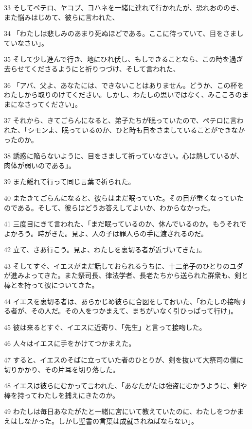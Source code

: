 \par 33 そしてペテロ、ヤコブ、ヨハネを一緒に連れて行かれたが、恐れおののき、また悩みはじめて、彼らに言われた、
\par 34 「わたしは悲しみのあまり死ぬほどである。ここに待っていて、目をさましていなさい」。
\par 35 そして少し進んで行き、地にひれ伏し、もしできることなら、この時を過ぎ去らせてくださるようにと祈りつづけ、そして言われた、
\par 36 「アバ、父よ、あなたには、できないことはありません。どうか、この杯をわたしから取りのけてください。しかし、わたしの思いではなく、みこころのままになさってください」。
\par 37 それから、きてごらんになると、弟子たちが眠っていたので、ペテロに言われた、「シモンよ、眠っているのか、ひと時も目をさましていることができなかったのか。
\par 38 誘惑に陥らないように、目をさまして祈っていなさい。心は熱しているが、肉体が弱いのである」。
\par 39 また離れて行って同じ言葉で祈られた。
\par 40 またきてごらんになると、彼らはまだ眠っていた。その目が重くなっていたのである。そして、彼らはどうお答えしてよいか、わからなかった。
\par 41 三度目にきて言われた、「まだ眠っているのか、休んでいるのか。もうそれでよかろう。時がきた。見よ、人の子は罪人らの手に渡されるのだ。
\par 42 立て、さあ行こう。見よ、わたしを裏切る者が近づいてきた」。
\par 43 そしてすぐ、イエスがまだ話しておられるうちに、十二弟子のひとりのユダが進みよってきた。また祭司長、律法学者、長老たちから送られた群衆も、剣と棒とを持って彼についてきた。
\par 44 イエスを裏切る者は、あらかじめ彼らに合図をしておいた、「わたしの接吻する者が、その人だ。その人をつかまえて、まちがいなく引ひっぱって行け」。
\par 45 彼は来るとすぐ、イエスに近寄り、「先生」と言って接吻した。
\par 46 人々はイエスに手をかけてつかまえた。
\par 47 すると、イエスのそばに立っていた者のひとりが、剣を抜いて大祭司の僕に切りかかり、その片耳を切り落した。
\par 48 イエスは彼らにむかって言われた、「あなたがたは強盗にむかうように、剣や棒を持ってわたしを捕えにきたのか。
\par 49 わたしは毎日あなたがたと一緒に宮にいて教えていたのに、わたしをつかまえはしなかった。しかし聖書の言葉は成就されねばならない」。
